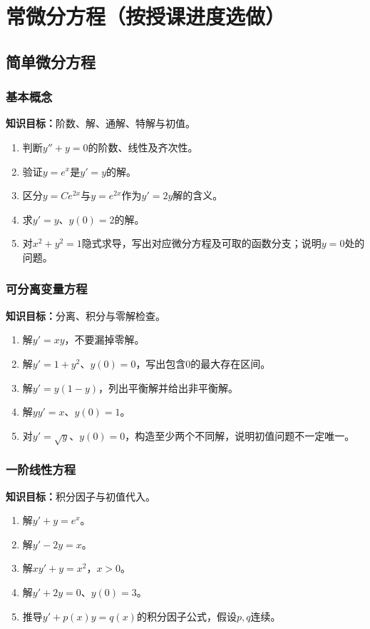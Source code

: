 \documentclass[11pt,a4paper,fontset=fandol]{ctexrep}
\newcommand{\goal}[1]{\textbf{知识目标：}#1\par}
\begin{document}
\chapter{常微分方程（按授课进度选做）}
\section{简单微分方程}
\subsection{基本概念}
\goal{阶数、解、通解、特解与初值。}
\begin{enumerate}
\item 判断$y''+y=0$的阶数、线性及齐次性。
\item 验证$y=e^x$是$y'=y$的解。
\item 区分$y=Ce^{2x}$与$y=e^{2x}$作为$y'=2y$解的含义。
\item 求$y'=y$、$y(0)=2$的解。
\item 对$x^2+y^2=1$隐式求导，写出对应微分方程及可取的函数分支；说明$y=0$处的问题。
\end{enumerate}
\subsection{可分离变量方程}
\goal{分离、积分与零解检查。}
\begin{enumerate}
\item 解$y'=xy$，不要漏掉零解。
\item 解$y'=1+y^2$、$y(0)=0$，写出包含0的最大存在区间。
\item 解$y'=y(1-y)$，列出平衡解并给出非平衡解。
\item 解$yy'=x$、$y(0)=1$。
\item 对$y'=\sqrt y$、$y(0)=0$，构造至少两个不同解，说明初值问题不一定唯一。
\end{enumerate}
\subsection{一阶线性方程}
\goal{积分因子与初值代入。}
\begin{enumerate}
\item 解$y'+y=e^x$。
\item 解$y'-2y=x$。
\item 解$xy'+y=x^2$，$x>0$。
\item 解$y'+2y=0$、$y(0)=3$。
\item 推导$y'+p(x)y=q(x)$的积分因子公式，假设$p,q$连续。
\end{enumerate}
\end{document}
